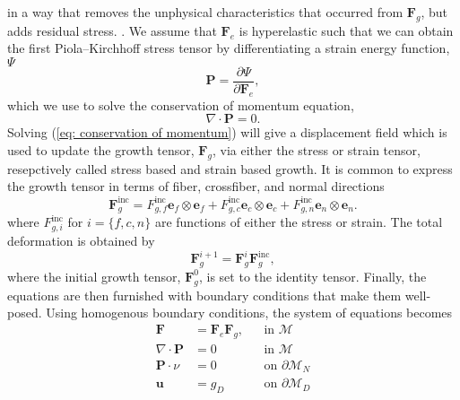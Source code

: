  in a way that removes the unphysical characteristics that occurred from $\mathbf{F}_g$, but adds residual stress. . We assume that $\mathbf{F}_e$ is hyperelastic such that we can obtain the first Piola–Kirchhoff stress tensor by differentiating a strain energy function, $\Psi$
\begin{equation}
\label{eq: stress}
    \mathbf{P} = \frac{\partial\Psi}{\partial \mathbf{F}_e},
\end{equation}
which we use to solve the conservation of momentum equation,
\begin{equation}
\label{eq: conservation of momentum}
    \nabla\cdot\mathbf{P} = 0.
\end{equation}
Solving (\ref{eq: conservation of momentum}) will give a displacement field which is used to update the growth tensor, $\mathbf{F}_g$, via either the stress or strain tensor, resepctively called stress based and strain based growth. It is common to express the growth tensor in terms of fiber, crossfiber, and normal directions 
\begin{equation*}
    \mathbf{F}_g^\mathrm{inc} = F^\mathrm{inc}_{g,f}\mathbf{e}_f\otimes \mathbf{e}_f + F^\mathrm{inc}_{g,c}\mathbf{e}_c\otimes \mathbf{e}_c + F^\mathrm{inc}_{g,n}\mathbf{e}_n\otimes \mathbf{e}_n.
\end{equation*}
where $F^\mathrm{inc}_{g, i}$ for  $i = \{f, c, n\}$ are functions of either the stress or strain. The total deformation is obtained by 
\begin{equation*}
    \mathbf{F}_g^{i + 1} = \mathbf{F}_g^i\mathbf{F}_g^\mathrm{inc},
\end{equation*}
where the initial growth tensor, $\mathbf{F}_g^0$, is set to the identity tensor. Finally, the equations are then furnished with boundary conditions that make them well-posed. Using homogenous boundary conditions, the system of equations becomes
\begin{equation} \label{eq: system of equations}
\begin{aligned}
    \mathbf{F} & = \mathbf{F}_e\mathbf{F}_g, && \text{in } \mathcal{M}\\
    \nabla\cdot\mathbf{P} & = 0 && \text{in } \mathcal{M} \\
    \mathbf{P}\cdot \nu & = 0 && \text{on } \partial\mathcal{M}_N \\
    \mathbf{u} & = g_D && \text{on } \partial\mathcal{M}_D
\end{aligned}
\end{equation} 
